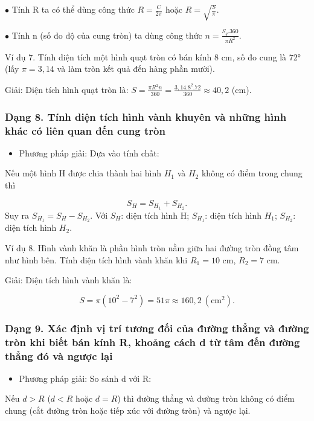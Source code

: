 \documentclass[%
    fontsize=12pt,%
    chapterprefix=false,%
    open=right,%
    twoside=false,%
    numbers=noenddot,%
    headings=optiontohead,%
    final,%
    DIV=15,%
    parskip=half %
]{scrbook}
\begin{document}

$\bullet$ Tính R ta có thể dùng công thức $ R = \frac{C}{2\pi} $ hoặc $ R = \sqrt{\frac{S}{\pi}} $.

$\bullet$ Tính n (số đo độ của cung tròn) ta dùng công thức $ n = \frac{S_q . 360}{\pi R^2} $.

Ví dụ 7. Tính diện tích một hình quạt tròn có bán kính 8 cm, số đo cung là 72° (lấy $ \pi = 3,14 $ và làm tròn kết quả đến hàng phần mười).

Giải: Diện tích hình quạt tròn là: $ S = \frac{\pi R^2 n}{360} = \frac{3,14 . 8^2 . 72}{360} \approx 40,2 $ (cm).
\subsubsection{Dạng 8. Tính diện tích hình vành khuyên và những hình khác có liên quan đến cung tròn}

\begin{itemize}
  \item Phương pháp giải: Dựa vào tính chất:
\end{itemize}

Nếu một hình H được chia thành hai hình $ H_1 $ và $ H_2 $ không có điểm trong chung thì

\[ S_H = S_{H_1} + S_{H_2}. \]
Suy ra $ S_{H_1} = S_H - S_{H_2} $. Với $ S_H $: diện tích hình H; $ S_{H_1} $: diện tích hình $ H_1 $; $ S_{H_2} $: diện tích hình $ H_2 $.

Ví dụ 8. Hình vành khăn là phần hình tròn nằm giữa hai đường tròn đồng tâm như hình bên. Tính diện tích hình vành khăn khi $ R_1 = 10 $ cm, $ R_2 = 7 $ cm.

Giải: Diện tích hình vành khăn là:

\[ S = \pi \left( 10^2 - 7^2 \right) = 51\pi \approx 160,2 \ (\text{cm}^2). \]
\subsubsection{Dạng 9. Xác định vị trí tương đối của đường thẳng và đường tròn khi biết bán kính R, khoảng cách d từ tâm đến đường thẳng đó và ngược lại}

\begin{itemize}
  \item Phương pháp giải: So sánh d với R:
\end{itemize}

Nếu $ d > R $ ($ d < R $ hoặc $ d = R $) thì đường thẳng và đường tròn không có điểm chung (cắt đường tròn hoặc tiếp xúc với đường tròn) và ngược lại.
\end{document}
